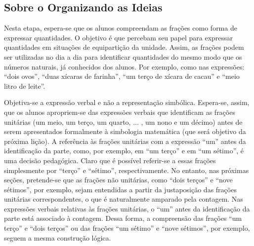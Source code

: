 \subsection{Sobre o Organizando as Ideias}

  Nesta etapa, espera-se que os alunos compreendam as frações como forma de expressar quantidades. O objetivo é que percebam seu papel para expressar quantidades em situações de equipartição da unidade. Assim, as frações podem ser utilizadas no dia a dia para identificar quantidades do mesmo modo que os números naturais, já conhecidos dos alunos. Por exemplo, como nas expressões:   ``dois ovos'',   ``duas xícaras de farinha'',   ``um terço de xícara de cacau'' e   ``meio litro de leite''.

  Objetiva-se a expressão verbal e não a representação simbólica. Espera-se, assim, que os alunos apropriem-se das expressões verbais que identificam as frações unitárias (um meio, um terço, um quarto, ... , um nono e um décimo) antes de serem apresentados formalmente à simbologia matemática (que será objetivo da próxima lição).  A referência às frações unitárias com a expressão   ``um'' antes da identificação da parte, como, por exemplo, em   ``um terço'' e em   ``um sétimo'', é uma decisão pedagógica. Claro que é possível referir-se a essas frações simplesmente por   ``terço'' e   ``sétimo'', respectivamente. No entanto, nas próximas seções, pretende-se que as frações não unitárias, como   ``dois terços'' e ``nove sétimos'', por exemplo, sejam entendidas a partir da justaposição das frações unitárias correspondentes, o que é naturalmente amparado pela contagem. Nas expressões verbais relativas às frações unitárias, o   ``um'' antes da identificação da parte está associado à contagem. Dessa forma, a compreensão das frações   ``um terço'' e   ``dois terços'' ou das frações ``um sétimo'' e ``nove sétimos'', por exemplo, seguem a mesma construção lógica.

\Bg

